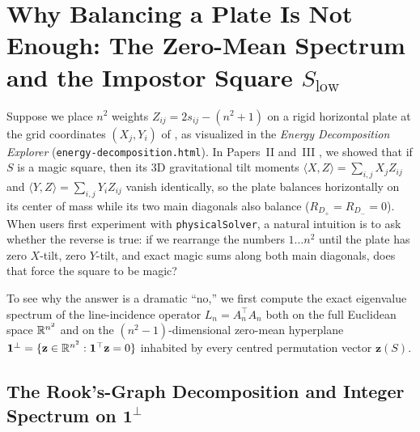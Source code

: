 \section{Why Balancing a Plate Is Not Enough: The Zero-Mean Spectrum and the Impostor Square \texorpdfstring{$S_{\mathrm{low}}$}{S\_low}}
\label{sec:spectral}

Suppose we place $n^2$ weights $Z_{ij} = 2s_{ij} - (n^2+1)$ on a rigid horizontal plate at the grid coordinates $(X_j, Y_i)$ of , as visualized in the \emph{Energy Decomposition Explorer} (\texttt{energy-decomposition.html}). In Papers~II and~III \cite{mathewson2026moments,mathewson2026mechanics}, we showed that if $S$ is a magic square, then its $3\mathrm{D}$ gravitational tilt moments $\langle X,Z\rangle = \sum_{i,j} X_j Z_{ij}$ and $\langle Y,Z\rangle = \sum_{i,j} Y_i Z_{ij}$ vanish identically, so the plate balances horizontally on its center of mass while its two main diagonals also balance ($R_{D_+} = R_{D_-} = 0$). When users first experiment with \texttt{physicalSolver}, a natural intuition is to ask whether the reverse is true: if we rearrange the numbers $1\dots n^2$ until the plate has zero $X$-tilt, zero $Y$-tilt, and exact magic sums along both main diagonals, does that force the square to be magic?

To see why the answer is a dramatic ``no,'' we first compute the exact eigenvalue spectrum of the line-incidence operator $L_n = A_n^\top A_n$ both on the full Euclidean space $\mathbb{R}^{n^2}$ and on the $(n^2-1)$-dimensional zero-mean hyperplane $\mathbf{1}^\perp = \{\mathbf{z}\in\mathbb{R}^{n^2} : \mathbf{1}^\top \mathbf{z} = 0\}$ inhabited by every centred permutation vector $\mathbf{z}(S)$.

\subsection{The Rook's-Graph Decomposition and Integer Spectrum on \texorpdfstring{$\mathbf{1}^\perp$}{1-perp}}

